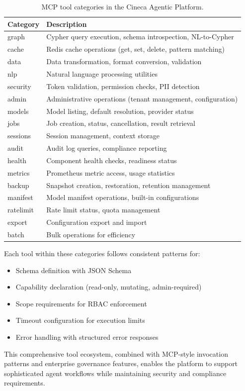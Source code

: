 \begin{table}[ht]
\centering
\caption{MCP tool categories in the Cineca Agentic Platform.}
\label{tab:mcp-categories}
\small
\begin{tabular}{lp{8cm}}
\hline
\textbf{Category} & \textbf{Description} \\
\hline
graph & Cypher query execution, schema introspection, NL-to-Cypher \\
cache & Redis cache operations (get, set, delete, pattern matching) \\
data & Data transformation, format conversion, validation \\
nlp & Natural language processing utilities \\
security & Token validation, permission checks, PII detection \\
admin & Administrative operations (tenant management, configuration) \\
models & Model listing, default resolution, provider status \\
jobs & Job creation, status, cancellation, result retrieval \\
sessions & Session management, context storage \\
audit & Audit log queries, compliance reporting \\
health & Component health checks, readiness status \\
metrics & Prometheus metric access, usage statistics \\
backup & Snapshot creation, restoration, retention management \\
manifest & Model manifest operations, built-in configurations \\
ratelimit & Rate limit status, quota management \\
export & Configuration export and import \\
batch & Bulk operations for efficiency \\
\hline
\end{tabular}
\end{table}

Each tool within these categories follows consistent patterns for:
\begin{itemize}
    \item Schema definition with JSON Schema
    \item Capability declaration (read-only, mutating, admin-required)
    \item Scope requirements for RBAC enforcement
    \item Timeout configuration for execution limits
    \item Error handling with structured error responses
\end{itemize}

This comprehensive tool ecosystem, combined with MCP-style invocation patterns and enterprise governance features, enables the platform to support sophisticated agent workflows while maintaining security and compliance requirements.
